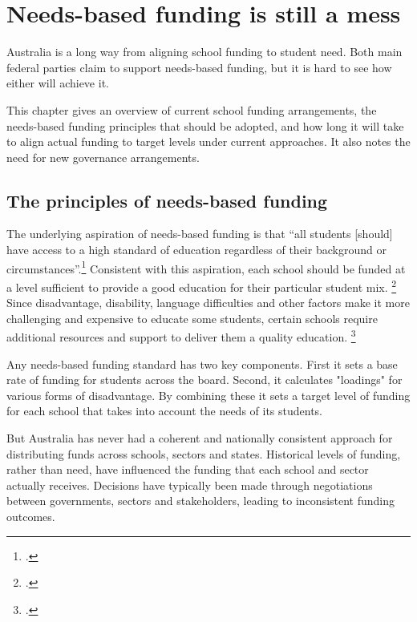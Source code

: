 \documentclass{grattan}
\begin{document}
\chapter{Needs-based funding is still a mess}\label{chap:needs-based-funding-is-still-a-mess}

Australia is a long way from aligning school funding to student need.
Both main federal parties claim to support needs-based funding, but it is hard to see how either will achieve it.

This chapter gives an overview of current school funding arrangements, the needs-based funding principles that should be adopted, and how long it will take to align actual funding to target levels under current approaches. It also notes the need for new governance arrangements.

\section{The principles of needs-based funding}\label{sec:the-principles-of-needs based-funding}

The underlying aspiration of needs-based funding is that ``all students [should] have access to a high standard of education regardless of their background or circumstances''.\footcite[][xxxi]{Gonski2011ReviewFundingSchooling}
Consistent with this aspiration, each school should be funded at a level sufficient to provide a good education for their particular student mix.%
\footcite[][xxi]{Gonski2011ReviewFundingSchooling}
Since disadvantage, disability, language difficulties and other factors make it more challenging and expensive to educate some students, certain schools require additional resources and support to deliver them a quality education.
\footcite[][xxi]{Gonski2011ReviewFundingSchooling}

Any needs-based funding standard has two key components. First it sets a base rate of funding for students across the board.  Second, it calculates "loadings" for various forms of disadvantage. By combining these it sets a target level of funding for each school that takes into account the needs of its students.

But Australia has never had a coherent and nationally consistent approach for distributing funds across schools, sectors and states.
Historical levels of funding, rather than need, have influenced the funding that each school and sector actually receives. Decisions have typically been made through negotiations between governments, sectors and stakeholders, leading to inconsistent funding outcomes.
\end{document}

